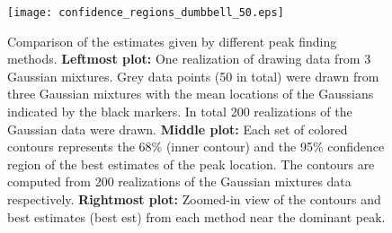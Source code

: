 \documentclass[letterpaper,useAMS,usenatbib]{mn2e}
\begin{document}
\begin{figure}
	\texttt{[image: confidence\_regions\_dumbbell\_50.eps]}
	\caption{Comparison of the estimates given by different peak finding methods.
		{\bf Leftmost plot:} One realization of drawing data from 3 Gaussian
		mixtures. Grey data points (50 in total) were drawn from three
		Gaussian mixtures with the mean locations of the Gaussians indicated by the
		black markers. In total 200 realizations of the Gaussian data were drawn.
		{\bf Middle plot:} Each set of colored contours represents the
		68\% (inner contour) and the 95\% confidence region of the best estimates
		of the peak location. The contours are computed from 200 realizations of the Gaussian
		mixtures data respectively. {\bf Rightmost plot:} Zoomed-in view of the
		contours and best estimates (best est) from each method near the dominant peak.  
		\label{fig:dumbbell500}}
\end{figure}
\clearpage\bsp\label{lastpage} 
\end{document}
